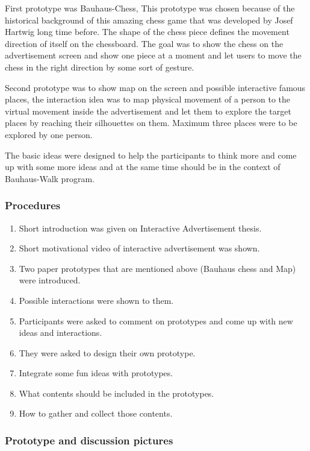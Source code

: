 First prototype was Bauhaus-Chess, This prototype was chosen because of the historical background of this amazing chess game that was developed by Josef Hartwig \cite{Josef} long time before. The shape of the chess piece defines the movement direction of itself on the chessboard. The goal was to show the chess on the advertisement screen and show one piece at a moment and let users to move the chess in the right direction by some sort of gesture. 

Second prototype was to show map on the screen and possible interactive famous places, the interaction idea was to map physical movement of a person to the virtual movement inside the advertisement and let them to explore the target places by reaching their silhouettes on them. Maximum three places were to be explored by one person.

The basic ideas were designed to help the participants to think more and come up with some more ideas and at the same time should be in the context of Bauhaus-Walk program. 

\subsubsection{Procedures}
\begin{enumerate}
\item   Short introduction was given on Interactive Advertisement thesis.
\item	Short motivational video of interactive advertisement was shown.
\item	Two paper prototypes that are mentioned above (Bauhaus chess and Map) were introduced.
\item	Possible interactions were shown to them.
\item	Participants were asked to comment on prototypes and come up with new ideas and interactions.
\item	They were asked to design their own prototype.
\item	Integrate some fun ideas with prototypes.
\item	What contents should be included in the prototypes.
\item	How to gather and collect those contents.
\end{enumerate}

\subsubsection{Prototype and discussion pictures}

